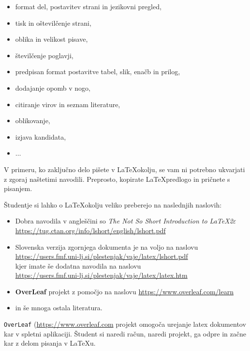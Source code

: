 \documentclass[12pt]{article}
\theoremstyle{definition}
\begin{document}
\begin{itemize}[nosep]
	\item format del, postavitev strani in jezikovni pregled,
	\item tisk in oštevilčenje strani,
	\item oblika in velikost pisave,
	\item številčenje poglavji,
	\item predpisan format postavitve tabel, slik, enačb in prilog,
	\item dodajanje opomb v nogo,
	\item citiranje virov in seznam literature,
	\item oblikovanje,
	\item izjava kandidata,
	\item $\dots$	
\end{itemize}

V primeru, ko zaključno delo pišete v \LaTeX okolju, se vam ni potrebno ukvarjati z zgoraj naštetimi navodili. Preprosto, kopirate \LaTeX predlogo in pričnete s pisanjem.

Študentje si lahko o \LaTeX okolju veliko preberejo na naslednjih naslovih:

\begin{itemize}
	\item Dobra navodila v angleščini so \textit{The Not So Short Introduction to \LaTeX 2$\varepsilon$}\\
	\href{https://tug.ctan.org/info/lshort/english/lshort.pdf}{https://tug.ctan.org/info/lshort/english/lshort.pdf}
	\item Slovenska verzija zgornjega dokumenta je na voljo na naslovu\\ \href{https://users.fmf.uni-lj.si/plestenjak/vaje/latex/lshort.pdf}{https://users.fmf.uni-lj.si/plestenjak/vaje/latex/lshort.pdf}\\
	kjer imate še dodatna navodila na naslovu\\
	\href{https://users.fmf.uni-lj.si/plestenjak/vaje/latex/latex.htm}{https://users.fmf.uni-lj.si/plestenjak/vaje/latex/latex.htm}
	\item \textbf{OverLeaf} projekt z pomočjo na naslovu \href{https://www.overleaf.com/learn}{https://www.overleaf.com/learn}
	\item in še mnoga ostala literatura. 
\end{itemize}

\texttt{OverLeaf} (\href{https://www.overleaf.com}{https://www.overleaf.com} projekt omogoča urejanje latex dokumentov kar v spletni aplikaciji. Študent si naredi račun, naredi projekt, ga odpre in začne kar z delom pisanja v \LaTeX u.
\end{document}
